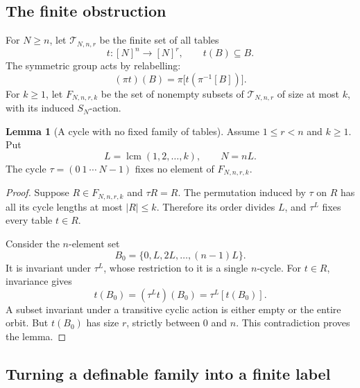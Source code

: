 \documentclass[11pt,letterpaper]{article}
\theoremstyle{definition}
\newtheorem{lemma}[definition]{Lemma}
\numberwithin{equation}{section}
\begin{document}
\subsection{The finite obstruction}

For $N\ge n$, let $\mathcal T_{N,n,r}$ be the finite set of all tables
\[
 t:[N]^n\longrightarrow[N]^r,
 \qquad t(B)\subseteq B.
\]
The symmetric group acts by relabelling:
\[
 (\pi t)(B)=\pi\bigl[t(\pi^{-1}[B])\bigr].
\]
For $k\ge1$, let $F_{N,n,r,k}$ be the set of nonempty subsets of $\mathcal T_{N,n,r}$ of size at most $k$, with its induced $S_N$-action.

\begin{lemma}[A cycle with no fixed family of tables]\label{lem:tables}
Assume $1\le r<n$ and $k\ge1$. Put
\[
 L=\operatorname{lcm}(1,2,\ldots,k),\qquad N=nL.
\]
The cycle $\tau=(0\ 1\ \cdots\ N-1)$ fixes no element of $F_{N,n,r,k}$.
\end{lemma}
\begin{proof}
Suppose $R\in F_{N,n,r,k}$ and $\tau R=R$. The permutation induced by $\tau$ on $R$ has all its cycle lengths at most $|R|\le k$. Therefore its order divides $L$, and $\tau^L$ fixes every table $t\in R$.

Consider the $n$-element set
\[
 B_0=\{0,L,2L,\ldots,(n-1)L\}.
\]
It is invariant under $\tau^L$, whose restriction to it is a single $n$-cycle. For $t\in R$, invariance gives
\[
 t(B_0)=(\tau^L t)(B_0)=\tau^L[t(B_0)].
\]
A subset invariant under a transitive cyclic action is either empty or the entire orbit. But $t(B_0)$ has size $r$, strictly between $0$ and $n$. This contradiction proves the lemma.
\end{proof}

\subsection{Turning a definable family into a finite label}
\end{document}
